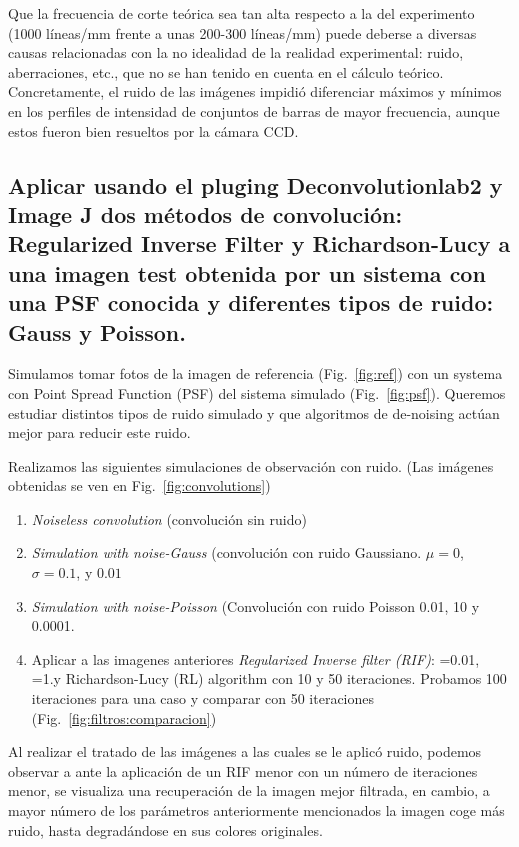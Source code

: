 \documentclass{./packages/optica-article}
\begin{document}
\begin{enumerate}
\begin{enumerate}
		            Que la frecuencia de corte teórica sea tan alta respecto a la del experimento (1000 líneas/mm frente a unas 200-300 líneas/mm) puede deberse a diversas causas relacionadas con la no idealidad de la realidad experimental: ruido, aberraciones, etc., que no se han tenido en cuenta en el cálculo teórico. Concretamente, el ruido de las imágenes impidió diferenciar máximos y mínimos en los perfiles de intensidad de conjuntos de barras de mayor frecuencia, aunque estos fueron bien resueltos por la cámara CCD.

	      \end{enumerate}

\end{enumerate}


\subsection{Aplicar usando el pluging Deconvolutionlab2 y Image J dos métodos de convolución: Regularized Inverse Filter y Richardson-Lucy a una imagen test obtenida por un sistema con una PSF conocida y diferentes tipos de ruido: Gauss y Poisson.}

Simulamos tomar fotos de la imagen de referencia (Fig.~\ref{fig:ref}) con un systema con Point Spread Function (PSF) del sistema simulado (Fig.~\ref{fig:psf}). Queremos estudiar distintos tipos de ruido simulado y que algoritmos de de-noising actúan mejor para reducir este ruido.

Realizamos las siguientes simulaciones de observación con ruido. (Las imágenes obtenidas se ven en Fig.~\ref{fig:convolutions})

\begin{enumerate}
	\item \emph{Noiseless convolution} (convolución sin ruido)
	\item \emph{Simulation with noise-Gauss} (convolución con ruido Gaussiano. $\mu=0$, $\sigma=0.1$, y $0.01$
	\item \emph{Simulation with noise-Poisson} (Convolución con ruido Poisson 0.01, 10 y 0.0001.
	\item Aplicar a las imagenes anteriores \emph{Regularized Inverse filter (RIF)}: =0.01, =1.y Richardson-Lucy (RL) algorithm con 10 y 50 iteraciones. Probamos 100 iteraciones para una caso y comparar con 50 iteraciones (Fig.~\ref{fig:filtros:comparacion})
\end{enumerate}

Al realizar el tratado de las imágenes a las cuales se le aplicó ruido, podemos observar a ante la aplicación de un RIF menor con un número de iteraciones menor, se visualiza una recuperación de la imagen mejor filtrada, en cambio, a mayor número de los parámetros anteriormente mencionados la imagen coge más ruido, hasta degradándose en sus colores originales.
\end{document}
